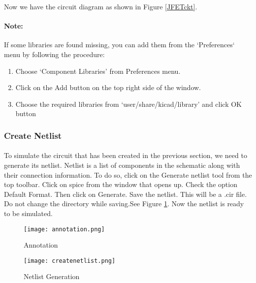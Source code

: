 Now we have the circuit diagram as shown in Figure \ref{JFETckt}.


\paragraph{Note:} If some libraries are found missing, you can add them from the `Preferences` menu by following the procedure: 

\begin{enumerate}
\item
Choose `Component Libraries' from Preferences menu.

\item
Click on the Add button on the top right side of the window.

\item
Choose the required libraries from `user/share/kicad/library' and click OK button

\end{enumerate}

\subsubsection{Create Netlist}

\paragraph{}To simulate the circuit that has been created in the previous section, we need to generate
its netlist. Netlist is a list of components in the schematic along with their connection
information. To do so, click on the Generate netlist tool from the top toolbar. Click on
spice from the window that opens up. Check the option Default Format. Then click
on Generate. Save the netlist. This will be a .cir file. Do
not change the directory while saving.See Figure \ref{createnetlist7}.
 Now the netlist is ready to be simulated. 
\begin{figure}
\begin{minipage}{.5\textwidth}
  \centering
  \texttt{[image: annotation.png]}
  \caption{Annotation}
  \label{annotation7}
\end{minipage}%
\begin{minipage}{.5\textwidth}
  \centering
  \texttt{[image: createnetlist.png]}
  \caption{Netlist Generation}
  \label{createnetlist7}
\end{minipage}
\end{figure}

